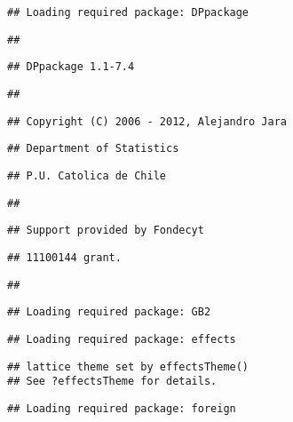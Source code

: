 \documentclass[11pt,]{article}
\begin{document}
\begin{verbatim}
## Loading required package: DPpackage
\end{verbatim}

\begin{verbatim}
## 
\end{verbatim}

\begin{verbatim}
## DPpackage 1.1-7.4
\end{verbatim}

\begin{verbatim}
## 
\end{verbatim}

\begin{verbatim}
## Copyright (C) 2006 - 2012, Alejandro Jara
\end{verbatim}

\begin{verbatim}
## Department of Statistics
\end{verbatim}

\begin{verbatim}
## P.U. Catolica de Chile
\end{verbatim}

\begin{verbatim}
## 
\end{verbatim}

\begin{verbatim}
## Support provided by Fondecyt
\end{verbatim}

\begin{verbatim}
## 11100144 grant.
\end{verbatim}

\begin{verbatim}
## 
\end{verbatim}

\begin{verbatim}
## Loading required package: GB2
\end{verbatim}

\begin{verbatim}
## Loading required package: effects
\end{verbatim}

\begin{verbatim}
## lattice theme set by effectsTheme()
## See ?effectsTheme for details.
\end{verbatim}

\begin{verbatim}
## Loading required package: foreign
\end{verbatim}
\end{document}
